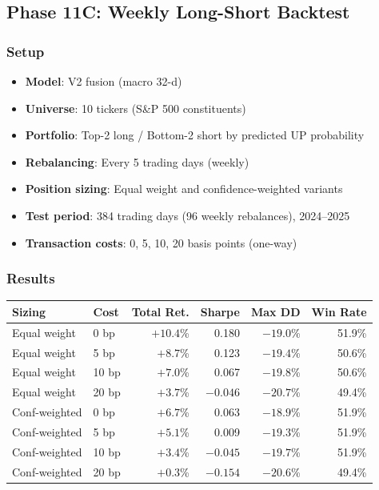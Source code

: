 \documentclass[12pt,a4paper]{article}
\begin{document}
\subsection{Phase 11C: Weekly Long-Short Backtest}

\subsubsection{Setup}
\begin{itemize}
    \item \textbf{Model}: V2 fusion (macro 32-d)
    \item \textbf{Universe}: 10 tickers (S\&P 500 constituents)
    \item \textbf{Portfolio}: Top-2 long / Bottom-2 short by predicted UP probability
    \item \textbf{Rebalancing}: Every 5 trading days (weekly)
    \item \textbf{Position sizing}: Equal weight and confidence-weighted variants
    \item \textbf{Test period}: 384 trading days (96 weekly rebalances), 2024--2025
    \item \textbf{Transaction costs}: 0, 5, 10, 20 basis points (one-way)
\end{itemize}

\subsubsection{Results}

\begin{center}
\begin{tabular}{llrrrr}
\hline
\textbf{Sizing}   & \textbf{Cost} & \textbf{Total Ret.} & \textbf{Sharpe} & \textbf{Max DD} & \textbf{Win Rate} \\
\hline
Equal weight      & 0 bp   & $+10.4$\%  & 0.180  & $-19.0$\% & 51.9\% \\
Equal weight      & 5 bp   & $+8.7$\%   & 0.123  & $-19.4$\% & 50.6\% \\
Equal weight      & 10 bp  & $+7.0$\%   & 0.067  & $-19.8$\% & 50.6\% \\
Equal weight      & 20 bp  & $+3.7$\%   & $-0.046$ & $-20.7$\% & 49.4\% \\
Conf-weighted     & 0 bp   & $+6.7$\%   & 0.063  & $-18.9$\% & 51.9\% \\
Conf-weighted     & 5 bp   & $+5.1$\%   & 0.009  & $-19.3$\% & 51.9\% \\
Conf-weighted     & 10 bp  & $+3.4$\%   & $-0.045$ & $-19.7$\% & 51.9\% \\
Conf-weighted     & 20 bp  & $+0.3$\%   & $-0.154$ & $-20.6$\% & 49.4\% \\
\hline
\end{tabular}
\end{center}
\end{document}
